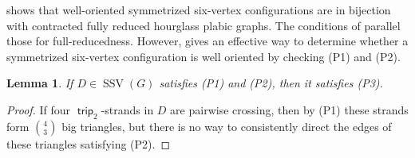 \documentclass{amsart}
\newtheorem{lemma}[theorem]{Lemma}
\theoremstyle{definition}
\theoremstyle{remark}
\numberwithin{equation}{section}
\DeclareMathOperator{\trip}{\mathsf{trip}}
\DeclareMathOperator{\ssv}{SSV}
\newcommand{\symm}{symmetrized }
\begin{document}
 shows that well-oriented \symm six-vertex configurations are in bijection with contracted fully reduced hourglass plabic graphs. The conditions of  parallel those for full-reducedness. However,  gives an effective way to determine whether a \symm six-vertex configuration is well oriented by checking (P1) and (P2).

\begin{lemma}
\label{lem:p1-p2-implies-p3}
If $D \in \ssv(G)$ satisfies (P1) and (P2), then it satisfies (P3).
\end{lemma}

\begin{proof}  
If four $\trip_2$-strands in $D$ are pairwise crossing, then by (P1) these strands form $\binom{4}{3}$ big triangles, but there is no way to consistently direct the edges of these triangles satisfying (P2).
\end{proof}
\end{document}
